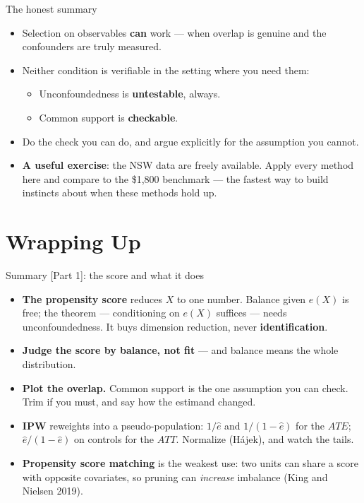 \documentclass[
  11pt,
  ignorenonframetext,
  aspectratio=169,
]{beamer}
\providecommand{\tightlist}{%
  \setlength{\itemsep}{0pt}\setlength{\parskip}{0pt}}
\begin{document}
\begin{frame}{The honest summary}
\protect{}\label{the-honest-summary}
\begin{itemize}
\tightlist
\item
  Selection on observables \textbf{can} work --- when overlap is genuine
  and the confounders are truly measured.
\item
  Neither condition is verifiable in the setting where you need them:

  \begin{itemize}
  \tightlist
  \item
    Unconfoundedness is \textbf{untestable}, always.
  \item
    Common support is \textbf{checkable}.
  \end{itemize}
\item
  Do the check you can do, and argue explicitly for the assumption you
  cannot.
\item
  \textbf{A useful exercise}: the NSW data are freely available. Apply
  every method here and compare to the \$1,800 benchmark --- the fastest
  way to build instincts about when these methods hold up.
\end{itemize}
\end{frame}

\section{Wrapping Up}\label{wrapping-up}

\begin{frame}{Summary {[}Part 1{]}: the score and what it does}
\protect{}\label{summary-part-1-the-score-and-what-it-does}
\begin{itemize}
\tightlist
\item
  \textbf{The propensity score} reduces \(X\) to one number. Balance
  given \(e(X)\) is free; the theorem --- conditioning on \(e(X)\)
  suffices --- needs unconfoundedness. It buys dimension reduction,
  never \textbf{identification}.
\item
  \textbf{Judge the score by balance, not fit} --- and balance means the
  whole distribution.
\item
  \textbf{Plot the overlap.} Common support is the one assumption you
  can check. Trim if you must, and say how the estimand changed.
\item
  \textbf{IPW} reweights into a pseudo-population: \(1/\hat e\) and
  \(1/(1-\hat e)\) for the \(ATE\); \(\hat e/(1-\hat e)\) on controls
  for the \(ATT\). Normalize (Hájek), and watch the tails.
\item
  \textbf{Propensity score matching} is the weakest use: two units can
  share a score with opposite covariates, so pruning can \emph{increase}
  imbalance (King and Nielsen 2019).
\end{itemize}
\end{frame}
\end{document}
